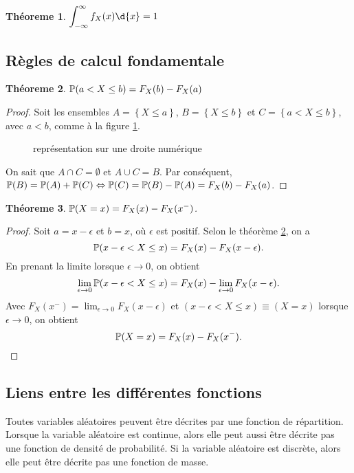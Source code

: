 \documentclass[11pt]{article}
\renewcommand\P{%
	\ensuremath{%
		\mathbb{P}%
	}%
}%
\newtheorem{theoreme}{Théoreme}[section]
\begin{document}
\begin{theoreme}
	$\displaystyle\int_{-\infty}^\infty f_X(x)\d{x}=1$
\end{theoreme}

\subsection{Règles de calcul fondamentale}
\begin{theoreme}\label{th:calc_fond}
	$\P(a<X\leq b)=F_X(b)-F_X(a)$
\end{theoreme}

\begin{proof}
	Soit les ensembles $A=\left\{X\leq a\right\}$, $B=\left\{X\leq b\right\}$
	et $C=\left\{a< X\leq b\right\}$, avec $a<b$, comme à la figure
	\ref{fig:droite_num}.
	\begin{figure}[H]
		\centering
		
		\caption{représentation sur une droite numérique}
		\label{fig:droite_num}
	\end{figure}
	
	On sait que $A\cap C=\emptyset$ et $A\cup C=B$. Par conséquent, 
	$\P(B)=\P(A)+\P(C)\Leftrightarrow \P(C)=\P(B)-\P(A)=F_X(b)-F_X(a)$.
\end{proof}

\begin{theoreme}
	$\P(X=x)=F_X(x)-F_X(x^-)$.
\end{theoreme}

\begin{proof}
	Soit $a=x-\epsilon$ et $b=x$, où $\epsilon$ est positif. Selon le théorème
	\ref{th:calc_fond}, on a
	\begin{equation*}
		\P(x-\epsilon<X\leq x)=F_X(x)-F_X(x-\epsilon).
	\end{equation*}
	En prenant la limite lorsque $\epsilon\rightarrow 0$, on obtient
	\begin{equation*}
		\lim_{\epsilon\rightarrow 0}\P(x-\epsilon<X\leq x)
		=F_X(x)-\lim_{\epsilon\rightarrow 0}F_X(x-\epsilon).
	\end{equation*}
	Avec $F_X(x^-)=\lim_{\epsilon\rightarrow 0}F_X(x-\epsilon)$ et
	$(x-\epsilon<X\leq x)\equiv (X=x)$ lorsque $\epsilon\rightarrow 0$, on
	obtient
	\begin{equation*}
		\P(X=x)=F_X(x)-F_X(x^-).\qedhere
	\end{equation*}
\end{proof}

\subsection{Liens entre les différentes fonctions}
Toutes variables aléatoires peuvent être décrites par une fonction de
répartition. Lorsque la variable aléatoire est continue, alors elle peut aussi
être décrite pas une fonction de densité de probabilité. Si la variable
aléatoire est discrète, alors elle peut être décrite pas une fonction de masse.
\end{document}
